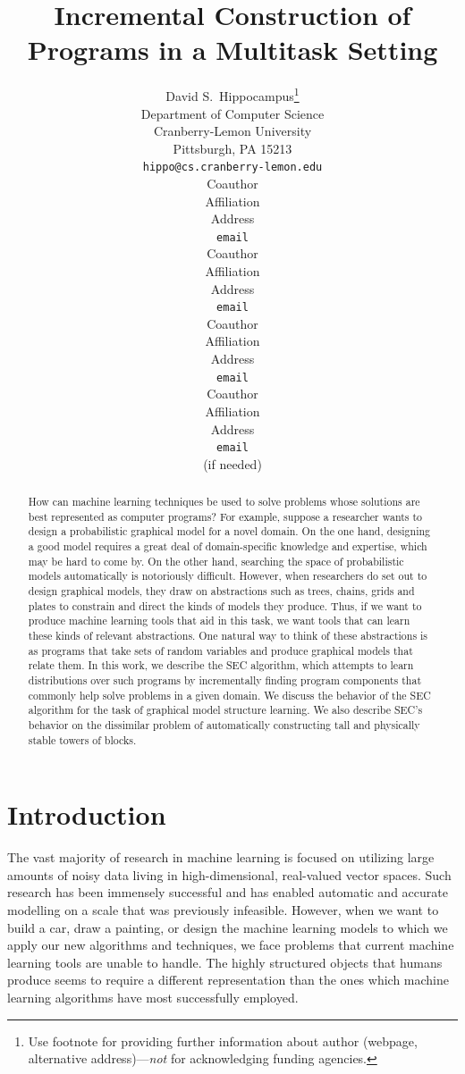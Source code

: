 \documentclass{article} %
\title{Incremental Construction of Programs in a Multitask Setting}
\author{
David S.~Hippocampus\thanks{ Use footnote for providing further information
about author (webpage, alternative address)---\emph{not} for acknowledging
funding agencies.} \\
Department of Computer Science\\
Cranberry-Lemon University\\
Pittsburgh, PA 15213 \\
\texttt{hippo@cs.cranberry-lemon.edu} \\
\And
Coauthor \\
Affiliation \\
Address \\
\texttt{email} \\
\AND
Coauthor \\
Affiliation \\
Address \\
\texttt{email} \\
\And
Coauthor \\
Affiliation \\
Address \\
\texttt{email} \\
\And
Coauthor \\
Affiliation \\
Address \\
\texttt{email} \\
(if needed)\\
}
\begin{document}
\maketitle

\begin{abstract}
How can machine learning techniques be used to solve problems whose solutions are best represented as computer programs? For example, suppose a researcher wants to design a probabilistic graphical model for a novel domain. On the one hand, designing a good model requires a great deal of domain-specific knowledge and expertise, which may be hard to come by. On the other hand, searching the space of probabilistic models automatically is notoriously difficult. However, when researchers do set out to design graphical models, they draw on abstractions such as trees, chains, grids and plates to constrain and direct the kinds of models they produce. Thus, if we want to produce machine learning tools that aid in this task, we want tools that can learn these kinds of relevant abstractions. One natural way to think of these abstractions is as programs that take sets of random variables and produce graphical models that relate them. In this work, we describe the SEC algorithm, which attempts to learn distributions over such programs by incrementally finding program components that commonly help solve problems in a given domain. We discuss the behavior of the SEC algorithm for the task of graphical model structure learning. We also describe SEC's behavior on the dissimilar problem of automatically constructing tall and physically stable towers of blocks. 
\end{abstract}

\section{Introduction}


The vast majority of research in machine learning is focused on utilizing large amounts of noisy data living in high-dimensional, real-valued vector spaces. Such research has been immensely successful and has enabled automatic and accurate modelling on a scale that was previously infeasible. However, when we want to build a car, draw a painting, or design the machine learning models to which we apply our new algorithms and techniques, we face problems that current machine learning tools are unable to handle. The highly structured objects that humans produce seems to require a different representation than the ones which machine learning algorithms have most successfully employed. 
\end{document}
